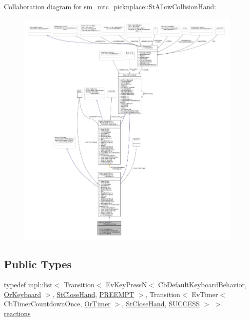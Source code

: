 Collaboration diagram for sm\+\_\+mtc\+\_\+picknplace\+:\+:St\+Allow\+Collision\+Hand\+:
\nopagebreak
\begin{figure}[H]
\begin{center}
\leavevmode
\includegraphics[width=350pt]{structsm__mtc__picknplace_1_1StAllowCollisionHand__coll__graph}
\end{center}
\end{figure}
\subsection*{Public Types}
\begin{DoxyCompactItemize}
\item 
typedef mpl\+::list$<$ Transition$<$ Ev\+Key\+PressN$<$ Cb\+Default\+Keyboard\+Behavior, \hyperlink{classsm__mtc__picknplace_1_1OrKeyboard}{Or\+Keyboard} $>$, \hyperlink{structsm__mtc__picknplace_1_1StCloseHand}{St\+Close\+Hand}, \hyperlink{classPREEMPT}{P\+R\+E\+E\+M\+PT} $>$, Transition$<$ Ev\+Timer$<$ Cb\+Timer\+Countdown\+Once, \hyperlink{classsm__mtc__picknplace_1_1OrTimer}{Or\+Timer} $>$, \hyperlink{structsm__mtc__picknplace_1_1StCloseHand}{St\+Close\+Hand}, \hyperlink{classSUCCESS}{S\+U\+C\+C\+E\+SS} $>$ $>$ \hyperlink{structsm__mtc__picknplace_1_1StAllowCollisionHand_a7513eaa99c015116994ceeb8a85f97ba}{reactions}
\end{DoxyCompactItemize}
